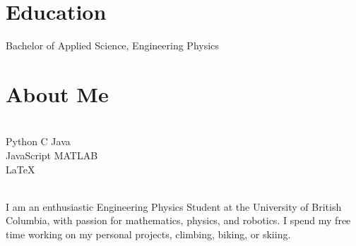 \documentclass[]{deedy-resume-openfont}
\begin{document}
\section{Education}
\begin{tightemize}
	\item Bachelor of Applied Science, Engineering Physics \\
\end{tightemize}
\vspace{8pt}

\section{About Me}
\begin{minipage}[t]{.35\textwidth}
	 \\
	Python \textbullet{} C \textbullet{} Java \\
	JavaScript \textbullet{} MATLAB \\
	\LaTeX
	\vspace{8pt}
\end{minipage}
\hfill
\begin{minipage}[t]{.55\textwidth}
	 \\
	I am an enthusiastic Engineering Physics Student at the University of British Columbia, with passion for mathematics, physics, and robotics. I spend my free time working on my personal projects, climbing, biking, or skiing.
\end{minipage}
\end{document}
